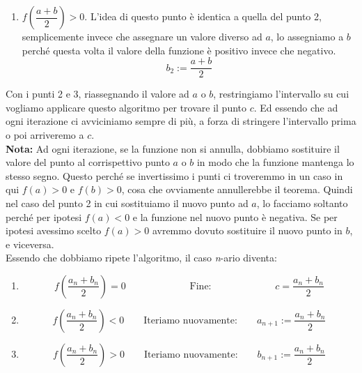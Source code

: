 {\begin{enumerate}
    \item $f\left(\dfrac{a + b}{2}\right) > 0$. L'idea di questo punto è identica a quella del punto 2, semplicemente invece che assegnare un valore diverso ad $a$, lo assegniamo a $b$ perché questa volta il valore della funzione è positivo invece che negativo.
      \begin{equation*}
        b_2 := \dfrac{a+b}{2}
      \end{equation*}
  \end{enumerate}
  Con i punti 2 e 3, riassegnando il valore ad $a$ o $b$, restringiamo l'intervallo su cui vogliamo applicare questo algoritmo per trovare il punto $c$. Ed essendo che ad ogni iterazione ci avviciniamo sempre di più, a forza di stringere l'intervallo prima o poi arriveremo a $c$.\\
  \textbf{Nota:} Ad ogni iterazione, se la funzione non si annulla, dobbiamo sostituire il valore del punto al corrispettivo punto $a$ o $b$ in modo che la funzione mantenga lo stesso segno. Questo perché se invertissimo i punti ci troveremmo in un caso in qui $f(a) > 0$ e $f(b) > 0$, cosa che ovviamente annullerebbe il teorema. Quindi nel caso del punto 2 in cui sostituiamo il nuovo punto ad $a$, lo facciamo soltanto perché per ipotesi $f(a) < 0$ e la funzione nel nuovo punto è negativa. Se per ipotesi avessimo scelto $f(a) > 0$ avremmo dovuto sostituire il nuovo punto in $b$, e viceversa.\\

  Essendo che dobbiamo ripete l'algoritmo, il caso \textit{n}-ario diventa:
  \begin{enumerate}
    \item 
      \begin{equation*}
        f\left(\dfrac{a_n + b_n}{2}\right) = 0 \;\; \qquad \qquad \qquad \text{Fine:} \;\; \qquad \qquad \qquad c = \dfrac{a_n + b_n}{2}
      \end{equation*}

    \item 
      \begin{equation*}
        f\left(\dfrac{a_n + b_n}{2}\right) < 0 \qquad \text{Iteriamo nuovamente:} \qquad a_{n + 1}:= \dfrac{a_n + b_n}{2}
      \end{equation*}
      
    \item 
      \begin{equation*}
        f\left(\dfrac{a_n + b_n}{2}\right) > 0 \qquad \text{Iteriamo nuovamente:} \qquad b_{n + 1}:= \dfrac{a_n + b_n}{2}
      \end{equation*}


\end{enumerate}}
